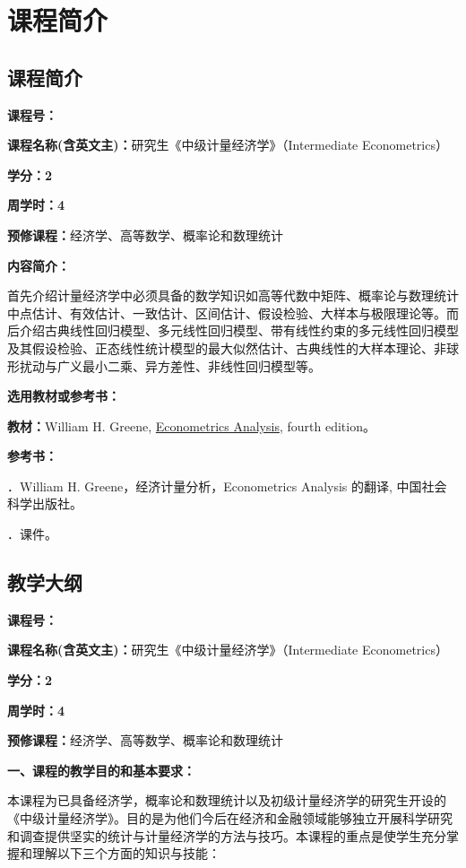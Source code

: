 \chapter*{课程简介}

\section*{课程简介}
\noindent \textbf{课程号：}

\noindent \textbf{课程名称(含英文主)：}研究生《中级计量经济学》（Intermediate Econometrics）

\noindent \textbf{学分：2}

\noindent \textbf{周学时：4}

\noindent \textbf{预修课程：}经济学、高等数学、概率论和数理统计

\noindent \textbf{内容简介：}

首先介绍计量经济学中必须具备的数学知识如高等代数中矩阵、概率论与数理统计中点估计、有效估计、一致估计、区间估计、假设检验、大样本与极限理论等。而后介绍古典线性回归模型、多元线性回归模型、带有线性约束的多元线性回归模型及其假设检验、正态线性统计模型的最大似然估计、古典线性的大样本理论、非球形扰动与广义最小二乘、异方差性、非线性回归模型等。

\noindent \textbf{选用教材或参考书：}

\noindent \textbf{教材：}William H. Greene, \href{https://bbs.pinggu.org/a-503441.html}{Econometrics Analysis}, fourth edition。

\noindent \textbf{参考书：}

．William H. Greene，经济计量分析，Econometrics Analysis 的翻译, 中国社会科学出版社。

．课件。 
	
\section*{教学大纲}
\noindent \textbf{课程号：}

\noindent \textbf{课程名称(含英文主)：}研究生《中级计量经济学》（Intermediate Econometrics）

\noindent \textbf{学分：2}

\noindent \textbf{周学时：4}

\noindent \textbf{预修课程：}经济学、高等数学、概率论和数理统计

\noindent \textbf{一、课程的教学目的和基本要求：}

本课程为已具备经济学，概率论和数理统计以及初级计量经济学的研究生开设的《中级计量经济学》。目的是为他们今后在经济和金融领域能够独立开展科学研究和调查提供坚实的统计与计量经济学的方法与技巧。本课程的重点是使学生充分掌握和理解以下三个方面的知识与技能：

